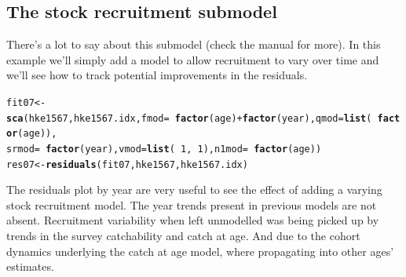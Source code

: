 \documentclass[a4paper,english,11pt]{article}\usepackage[]{graphicx}\usepackage[]{xcolor}
\makeatletter
\newcommand{\hlnum}[1]{\textcolor[rgb]{0.686,0.059,0.569}{#1}}%
\newcommand{\hlopt}[1]{\textcolor[rgb]{0,0,0}{#1}}%
\newcommand{\hldef}[1]{\textcolor[rgb]{0.345,0.345,0.345}{#1}}%
\newcommand{\hlkwb}[1]{\textcolor[rgb]{0.69,0.353,0.396}{#1}}%
\newcommand{\hlkwc}[1]{\textcolor[rgb]{0.333,0.667,0.333}{#1}}%
\newcommand{\hlkwd}[1]{\textcolor[rgb]{0.737,0.353,0.396}{\textbf{#1}}}%
\newenvironment{kframe}{%
 \def\at@end@of@kframe{}%
 \ifinner\ifhmode%
  \def\at@end@of@kframe{\end{minipage}}%
  \begin{minipage}{\columnwidth}%
 \fi\fi%
 \def\FrameCommand##1{\hskip\@totalleftmargin \hskip-\fboxsep
 \colorbox{shadecolor}{##1}\hskip-\fboxsep
     \hskip-\linewidth \hskip-\@totalleftmargin \hskip\columnwidth}%
 \MakeFramed {\advance\hsize-\width
   \@totalleftmargin\z@ \linewidth\hsize
   \@setminipage}}%
 {\par\unskip\endMakeFramed%
 \at@end@of@kframe}
\newenvironment{knitrout}{}{} %
\makeatother
\begin{document}
\subsection{The stock recruitment submodel }

There's a lot to say about this submodel (check the \aFa manual for more). In this example we'll simply add a model to allow recruitment to vary over time and we'll see how to track potential improvements in the residuals.

\begin{knitrout}
\color{fgcolor}\begin{kframe}
\begin{alltt}
\hldef{fit07} \hlkwb{<-} \hlkwd{sca}\hldef{(hke1567, hke1567.idx,} \hlkwc{fmod} \hldef{=} \hlopt{~}\hlkwd{factor}\hldef{(age)} \hlopt{+} \hlkwd{factor}\hldef{(year),} \hlkwc{qmod} \hldef{=} \hlkwd{list}\hldef{(}\hlopt{~}\hlkwd{factor}\hldef{(age)),}
    \hlkwc{srmod} \hldef{=} \hlopt{~}\hlkwd{factor}\hldef{(year),} \hlkwc{vmod} \hldef{=} \hlkwd{list}\hldef{(}\hlopt{~}\hlnum{1}\hldef{,} \hlopt{~}\hlnum{1}\hldef{),} \hlkwc{n1mod} \hldef{=} \hlopt{~}\hlkwd{factor}\hldef{(age))}
\hldef{res07} \hlkwb{<-} \hlkwd{residuals}\hldef{(fit07, hke1567, hke1567.idx)}
\end{alltt}
\end{kframe}
\end{knitrout}

The residuals plot by year are very useful to see the effect of adding a varying stock recruitment model. The year trends present in previous models are not absent. Recruitment variability when left unmodelled was being picked up by trends in the survey catchability and catch at age. And due to the cohort dynamics underlying the catch at age model, where propagating into other ages' estimates. 
\end{document}
